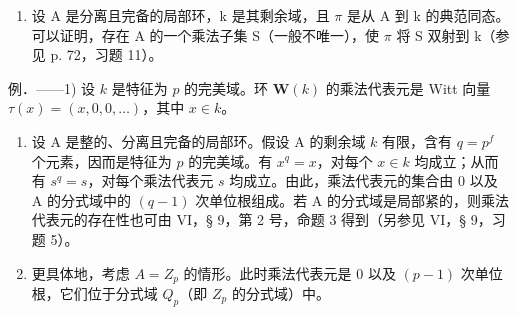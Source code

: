 \begin{enumerate}
\def\labelenumi{\arabic{enumi})}
\setcounter{enumi}{1}
\tightlist
\item
  设 A 是分离且完备的局部环，k 是其剩余域，且 \(\pi\) 是从 A 到 k 的典范同态。可以证明，存在 A 的一个乘法子集 S（一般不唯一），使 \(\pi\) 将 S 双射到 k（参见 p. 72，习题 11）。
\end{enumerate}

例．——1) 设 \(k\) 是特征为 \(p\) 的完美域。环 \(\mathbf{W}(k)\) 的乘法代表元是 Witt 向量 \(\tau(x) = (x, 0, 0, \ldots)\)，其中 \(x \in k\)。

\begin{enumerate}
\def\labelenumi{\arabic{enumi})}
\setcounter{enumi}{1}
\item
  设 A 是整的、分离且完备的局部环。假设 A 的剩余域 \(k\) 有限，含有 \(q = p^{f}\) 个元素，因而是特征为 \(p\) 的完美域。有 \(x^{q} = x\)，对每个 \(x \in k\) 均成立；从而有 \(s^{q} = s\)，对每个乘法代表元 \(s\) 均成立。由此，乘法代表元的集合由 0 以及 A 的分式域中的 \((q - 1)\) 次单位根组成。若 A 的分式域是局部紧的，则乘法代表元的存在性也可由 VI，§ 9，第 2 号，命题 3 得到（另参见 VI，§ 9，习题 5）。
\item
  更具体地，考虑 \(A = Z_{p}\) 的情形。此时乘法代表元是 0 以及 \((p - 1)\) 次单位根，它们位于分式域 \(Q_{p}\)（即 \(Z_{p}\) 的分式域）中。
\end{enumerate}


